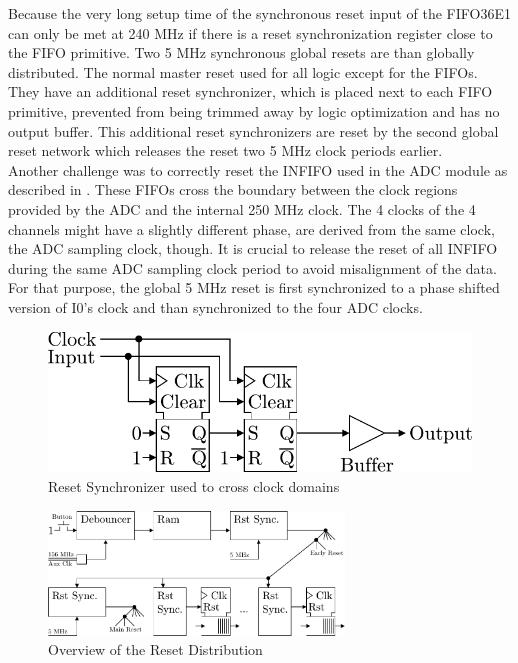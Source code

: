 Because the very long setup time of the synchronous reset input of the FIFO36E1
can only be met at 240 MHz if there is a reset synchronization register
close to the FIFO primitive. Two 5 MHz synchronous global resets are than
globally distributed. The normal master reset used for all logic except
for the \glspl{FIFO}. They have an additional reset synchronizer, which is
placed next to each \gls{FIFO} primitive, prevented from being trimmed
away by logic optimization and has no output buffer.
This additional reset synchronizers are reset by the second global reset network
which releases the reset two 5 MHz clock periods earlier.  \\

Another challenge was to correctly reset the \gls{INFIFO} used in the
\gls{ADC} module as described in . These \glspl{FIFO}
cross the boundary between the clock regions provided by the \gls{ADC} and
the internal 250 MHz clock. The 4 clocks of the 4 channels might
have a slightly different phase, are derived from the same clock, the
\gls{ADC} sampling clock, though. It is crucial to release the reset
of all \gls{INFIFO} during the same \gls{ADC} sampling clock period to avoid
misalignment of the data. For that purpose, the global 5 MHz
reset is first synchronized to a phase shifted version of I0's clock and
than synchronized to the four \gls{ADC} clocks. \\

\begin{figure}
  \centering
  \includegraphics{figures/RstSync}
  \caption{Reset Synchronizer used to cross clock domains}
  \label{fig:fpga_rst_sync}
\end{figure}

\begin{figure}
  \centering
  \includegraphics[width=0.7\textwidth]{figures/rst_generation}
  \caption{Overview of the Reset Distribution}
  \label{fig:fpga_rst_generation}
\end{figure}

